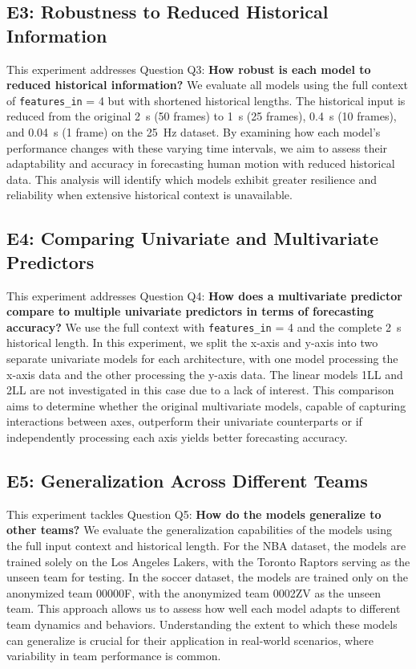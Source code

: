 \subsection{E3: Robustness to Reduced Historical Information}
\label{exp:e3}
This experiment addresses Question Q3: \textbf{How robust is each model to reduced historical information?} We evaluate all models using the full context of \texttt{features\_in} = 4 but with shortened historical lengths. The historical input is reduced from the original \SI{2}{\second} (50 frames) to \SI{1}{\second} (25 frames), \SI{0.4}{\second} (10 frames), and \SI{0.04}{\second} (1 frame) on the \SI{25}{\hertz} dataset. By examining how each model's performance changes with these varying time intervals, we aim to assess their adaptability and accuracy in forecasting human motion with reduced historical data. This analysis will identify which models exhibit greater resilience and reliability when extensive historical context is unavailable.

\subsection{E4: Comparing Univariate and Multivariate Predictors}
\label{exp:e4}
This experiment addresses Question Q4: \textbf{How does a multivariate predictor compare to multiple univariate predictors in terms of forecasting accuracy?} We use the full context with \texttt{features\_in} = 4 and the complete \SI{2}{\second} historical length. In this experiment, we split the x-axis and y-axis into two separate univariate models for each architecture, with one model processing the x-axis data and the other processing the y-axis data. The linear models 1LL and 2LL are not investigated in this case due to a lack of interest. This comparison aims to determine whether the original multivariate models, capable of capturing interactions between axes, outperform their univariate counterparts or if independently processing each axis yields better forecasting accuracy.


\subsection{E5: Generalization Across Different Teams}
\label{exp:e5}
This experiment tackles Question Q5: \textbf{How do the models generalize to other teams?} We evaluate the generalization capabilities of the models using the full input context and historical length. For the NBA dataset, the models are trained solely on the Los Angeles Lakers, with the Toronto Raptors serving as the unseen team for testing. In the soccer dataset, the models are trained only on the anonymized team 00000F, with the anonymized team 0002ZV as the unseen team. This approach allows us to assess how well each model adapts to different team dynamics and behaviors. Understanding the extent to which these models can generalize is crucial for their application in real-world scenarios, where variability in team performance is common.


